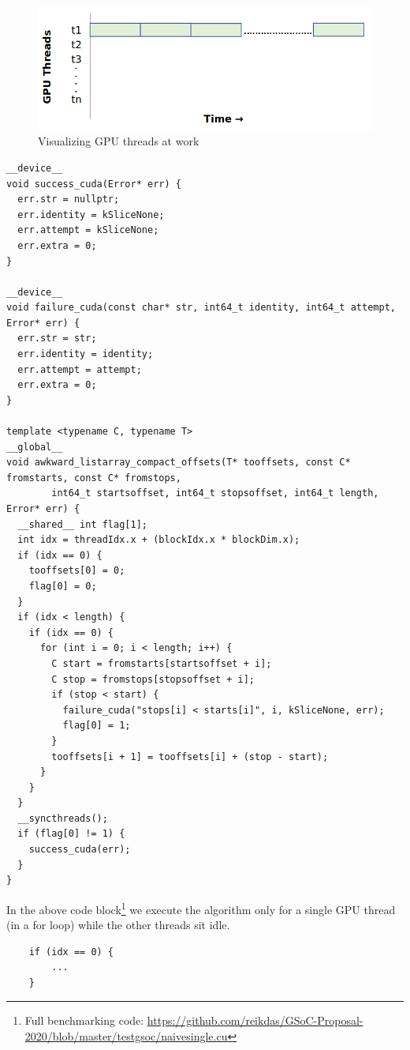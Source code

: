 \documentclass{article}
\begin{document}
\begin{figure}[H]
\includegraphics[width=\textwidth]{Graphics/naivesingle.PNG}
\caption{Visualizing GPU threads at work}
\end{figure}
\begin{mdframed}[backgroundcolor=light-gray, roundcorner=10pt,leftmargin=0.5, rightmargin=0.5, innertopmargin=5,innerbottommargin=5, outerlinewidth=1, linecolor=light-gray]
\begin{verbatim}
__device__
void success_cuda(Error* err) {
  err.str = nullptr;
  err.identity = kSliceNone;
  err.attempt = kSliceNone;
  err.extra = 0;
}

__device__
void failure_cuda(const char* str, int64_t identity, int64_t attempt, Error* err) {
  err.str = str;
  err.identity = identity;
  err.attempt = attempt;
  err.extra = 0;
}

template <typename C, typename T>
__global__
void awkward_listarray_compact_offsets(T* tooffsets, const C* fromstarts, const C* fromstops, 
        int64_t startsoffset, int64_t stopsoffset, int64_t length, Error* err) {
  __shared__ int flag[1];
  int idx = threadIdx.x + (blockIdx.x * blockDim.x);
  if (idx == 0) {
    tooffsets[0] = 0;
    flag[0] = 0;
  }
  if (idx < length) {
    if (idx == 0) {
      for (int i = 0; i < length; i++) {
        C start = fromstarts[startsoffset + i];
        C stop = fromstops[stopsoffset + i];
        if (stop < start) {
          failure_cuda("stops[i] < starts[i]", i, kSliceNone, err);
          flag[0] = 1;
        }
        tooffsets[i + 1] = tooffsets[i] + (stop - start);
      }
    }
  }
  __syncthreads();
  if (flag[0] != 1) {
    success_cuda(err);
  }
}
\end{verbatim}
\end{mdframed}
In the above code block\footnote{Full benchmarking code: \url{https://github.com/reikdas/GSoC-Proposal-2020/blob/master/testgsoc/naivesingle.cu}} we execute the algorithm only for a single GPU thread (in a for loop) while the other threads sit idle.
\begin{mdframed}[backgroundcolor=light-gray, roundcorner=10pt,leftmargin=0.5, rightmargin=0.5, innertopmargin=1,innerbottommargin=1, outerlinewidth=1, linecolor=light-gray]
\begin{verbatim}
    if (idx == 0) {
        ...
    }
\end{verbatim}
\end{mdframed}
\end{document}
